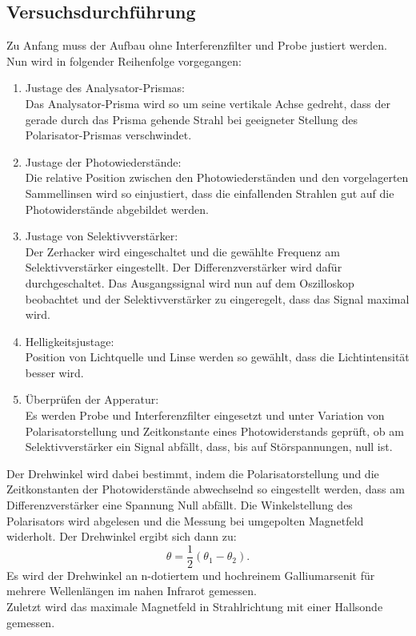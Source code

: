 \subsection{Versuchsdurchführung}
Zu Anfang muss der Aufbau ohne Interferenzfilter und Probe justiert werden.
Nun wird in folgender Reihenfolge vorgegangen:
\begin{enumerate}
  \item Justage des Analysator-Prismas:\\
  Das Analysator-Prisma wird so um seine vertikale Achse gedreht, dass
  der gerade durch das Prisma gehende Strahl bei geeigneter Stellung des
  Polarisator-Prismas verschwindet.
  \item Justage der Photowiederstände:\\
  Die relative Position zwischen den Photowiederständen und den vorgelagerten
  Sammellinsen wird so einjustiert, dass die einfallenden Strahlen gut auf
  die Photowiderstände abgebildet werden.
  \item Justage von Selektivverstärker:\\
  Der Zerhacker wird eingeschaltet und die gewählte Frequenz am Selektivverstärker
  eingestellt. Der Differenzverstärker wird dafür durchgeschaltet. Das Ausgangssignal wird
  nun auf dem Oszilloskop beobachtet und  der Selektivverstärker zu eingeregelt,
  dass das Signal maximal wird.
  \item Helligkeitsjustage:\\
  Position von Lichtquelle und Linse werden so gewählt, dass die Lichtintensität
  besser wird.
  \item Überprüfen der Apperatur:\\
  Es werden Probe und Interferenzfilter eingesetzt und unter Variation von
  Polarisatorstellung und Zeitkonstante eines Photowiderstands geprüft,
  ob am Selektivverstärker ein Signal abfällt, dass, bis auf Störspannungen, null ist.
\end{enumerate}
Der Drehwinkel wird dabei bestimmt, indem die Polarisatorstellung und die Zeitkonstanten der
Photowiderstände abwechselnd so eingestellt werden, dass am Differenzverstärker eine Spannung
Null abfällt. Die Winkelstellung des Polarisators wird abgelesen und die Messung
bei umgepolten Magnetfeld widerholt. Der Drehwinkel ergibt sich dann zu:
\begin{equation}
  \theta = \frac{1}{2} \left(\theta_1 - \theta_2 \right).
  \label{runederaffe}
\end{equation}
Es wird der Drehwinkel an n-dotiertem und hochreinem Galliumarsenit für mehrere Wellenlängen
im nahen Infrarot gemessen.\\
Zuletzt wird das maximale Magnetfeld in Strahlrichtung mit einer Hallsonde gemessen.
